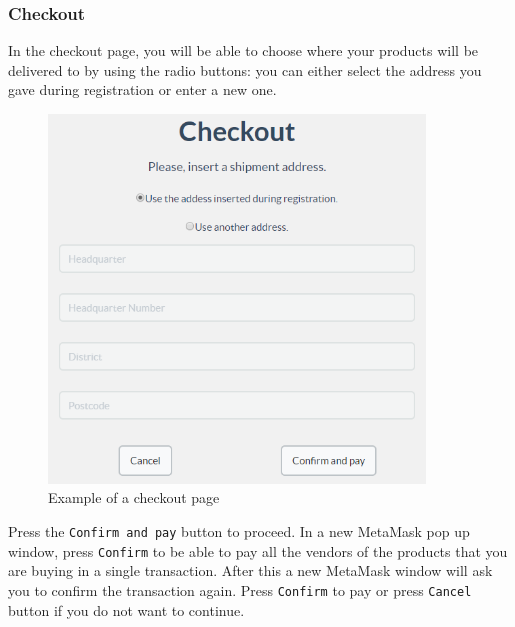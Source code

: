 		\subsubsection{Checkout}
		In the checkout page, you will be able to choose where your products 
		will be delivered to by using the radio buttons: you can either select 
		the address you gave during registration or enter a new one.
	\begin{figure}[H]
		\includegraphics[width=10cm]{res/images/checkout.png}
		\centering
		\caption{Example of a checkout page}
	\end{figure}
	\noindent Press the \texttt{Confirm and pay} button to proceed. In a new 
	MetaMask\glo{} pop up window, press \texttt{Confirm} to be able to pay all
	the vendors of the products that you are buying in a single transaction.
	After this a new MetaMask\glo{} window will ask you to confirm the
	transaction again. Press \texttt{Confirm} to pay or press \texttt{Cancel}
	button if you do not want to continue.
